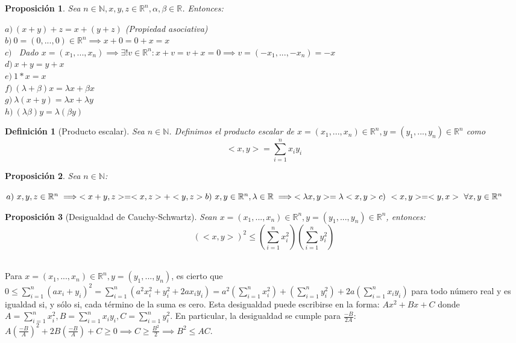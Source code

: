 \documentclass[11pt, a4paper]{article}
\makeatletter
\newif\IfInSansMode
\let\oldsf\sffamily
\renewcommand*{\sffamily}{\oldsf\mathversion{sans}\InSansModetrue}
\let\oldnorm\normalfont
\renewcommand*{\normalfont}{\oldnorm\InSansModefalse\mathversion{normal}}
\newcommand{\R}{\mathbb{R}} \newcommand{\N}{\mathbb{N}}
\renewenvironment{proof}[1][\proofname] {\par\pushQED{\qed}\normalfont\topsep6\p@\@plus6\p@\relax\trivlist\item[\hskip\labelsep\itshape\sffamily#1\@addpunct{.}]\ignorespaces}{\popQED\endtrivlist\@endpefalse}
\theoremstyle{theorem-style}
\newtheorem{nprop}{Proposición}[section]
\theoremstyle{definition-style}
\newtheorem{ndef}{Definición}[section]
\theoremstyle{remark-style}
\theoremstyle{example-style}
\makeatother
\begin{document}
\begin{nprop}
Sea $n \in \N, x,y,z \in \R^n, \alpha, \beta \in \R$. Entonces:

$a) \ (x+y)+z = x + (y+z)$ (Propiedad asociativa) \\
$b) \ 0 = (0,...,0) \in \R^n \implies x+0 = 0+x = x$ \\
$c)$ \ Dado $x = (x_1,...,x_n) \implies \exists ! v \in \R^n: x+v=v+x=0 \implies v = (-x_1,...,-x_n) = -x$ \\
$d) \ x+y = y+x$ \\
$e) \ 1*x = x$ \\
$f) \ (\lambda + \beta)x = \lambda x + \beta x$ \\
$g) \ \lambda (x+y) = \lambda x + \lambda y$ \\
$h) \ (\lambda \beta)y = \lambda (\beta y)$
	
\end{nprop}

\newpage

\begin{ndef}[Producto escalar]
Sea $n \in \N$. Definimos el producto escalar de $x = (x_1,...,x_n) \in \R^n, y = (y_1,...,y_n) \in \R^n$ como $$ <x,y> = \sum_{i=1}^{n}x_i y_i$$
\end{ndef}

\begin{nprop}
Sea $n \in \N$:

$a) \ x,y,z \in \R^n \implies <x+y,z> = <x,z> + <y,z> \\
b) \ x,y \in \R^n, \lambda \in \R \implies <\lambda x,y> = \lambda <x,y> \\
c) \ <x,y> = <y,x> \ \forall x,y \in \R^n $
\end{nprop}

\begin{nprop}[Desigualdad de Cauchy-Schwartz]
Sean $x = (x_1,...,x_n) \in \R^n, y = (y_1,...,y_n) \in \R^n$, entonces: $$(<x,y>)^2 \le (\sum_{i=1}^{n}x_i^2)(\sum_{i=1}^n y_i^2)$$ 
\end{nprop}

\begin{proof} \hfill \\
 Para $x = (x_1,...,x_n) \in \R^n, y = (y_1,...,y_n)$, es cierto que $0 \le \sum_{i=1}^n (ax_i+y_i)^2 = \sum_{i=1}^n (a^2x_i^2+y_i^2+2ax_iy_i) = a^2(\sum_{i=1}^n x_i^2)+(\sum_{i=1}^n y_i^2)+2a (\sum_{i=1}^n x_iy_i)$ para todo número real y es igualdad si, y sólo si, cada término de la suma es cero. Esta desigualdad puede escribirse en la forma: $Ax^2 + Bx + C$ donde $A = \sum_{i=1}^n x_i^2, B = \sum_{i=1}^n x_iy_i, C = \sum_{i=1}^n y_i^2$. En particular, la desigualdad se cumple para $\frac{-B}{2A}$: \ $A(\frac{-B}{A})^2 + 2B(\frac{-B}{A}) + C \ge 0 \implies C \ge \frac{B^2}{2} \implies B^2 \le AC$.
\end{proof}
\end{document}
